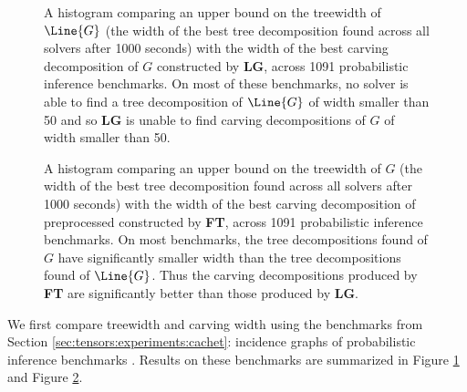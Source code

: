 

% 	

\begin{figure}
	\centering
	
\caption{\label{fig:wmc-width-lg} A histogram comparing an upper bound on the treewidth of $\Line{G}$ (the width of the best tree decomposition found across all solvers after 1000 seconds) with the width of the best carving decomposition of $G$ constructed by \textbf{LG}, across 1091 probabilistic inference benchmarks. On most of these benchmarks, no solver is able to find a tree decomposition of $\Line{G}$ of width smaller than 50 and so \textbf{LG} is unable to find carving decompositions of $G$ of width smaller than 50.}
\end{figure}

\begin{figure}
	\centering
	
\caption{\label{fig:wmc-width-ft} A histogram comparing an upper bound on the treewidth of $G$ (the width of the best tree decomposition found across all solvers after 1000 seconds) with the width of the best carving decomposition of preprocessed constructed by \textbf{FT}, across 1091 probabilistic inference benchmarks. On most benchmarks, the tree decompositions found of $G$ have significantly smaller width than the tree decompositions found of $\Line{G}$. Thus the carving decompositions produced by \textbf{FT} are significantly better than those produced by \textbf{LG}.}
\end{figure}

We first compare treewidth and carving width using the benchmarks from Section \ref{sec:tensors:experiments:cachet}: incidence graphs of probabilistic inference benchmarks \cite{SBK05}. Results on these benchmarks are summarized in Figure \ref{fig:wmc-width-lg} and Figure \ref{fig:wmc-width-ft}.

